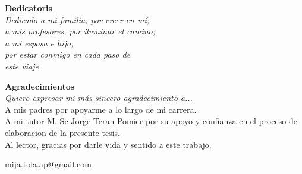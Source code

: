 \documentclass[12pt, openany]{book}
\title{
    \textbf{
      \Large{UNIVERSIDAD MAYOR DE SAN ANDR\'ES}\\
      \normalsize{
        FACULTAD DE CIENCIAS PURAS Y NATURALES\\
        CARRERA DE INFORM\'ATICA\\
      }
      \hfill \break
      \texttt{[image: umsa]}
      \break
      \begin{large}
        EVALUACION COMPARATIVA DE MODELOS GENERADORES DE GRAFOS ALEATORIOS PARA REDES COMPLEJAS
      \end{large}
      \break
      \small{
        Tesis de Grado para obtener el Título de Licenciatura en Informática \break
        Mención Ingeniería de Sistemas Informáticos\break
      }
      \break
      \large {
        POR: CARLOS MIJAEL TOLA APAZA\\
        TUTOR: M.Sc. JORGE TERAN
      }
      \break
      \small {
        LA PAZ - BOLIVIA \break
        Abril, 2024
      }
    }
}
\author{}
\date{}
\let\oldmaketitle\maketitle
\renewcommand{\maketitle}{\oldmaketitle\thispagestyle{empty}\newpage\setcounter{page}{1}}
\begin{document}
\maketitle


\thispagestyle{empty}
\vspace*{\fill} 

\begin{flushright}
  \textbf{Dedicatoria} \\
\textit{Dedicado a mi familia, por creer en mí;\\
 a mis profesores, por iluminar el camino;\\ 
a mi esposa e hijo, \\ 
por estar conmigo en cada paso de  \\
este viaje.}
\end{flushright}

\vspace{2cm} 
\newpage

\thispagestyle{empty} 

\vspace*{\fill} 

\begin{flushleft}
\textbf{Agradecimientos}\\ 
\textit{Quiero expresar mi más sincero agradecimiento a...}\\
A mis padres por apoyarme a lo largo de mi carrera. \\
A mi tutor M. Sc Jorge Teran Pomier por su apoyo y confianza en el proceso de elaboracion
de la presente tesis.\\
Al lector, gracias por darle vida y sentido a este trabajo.
\end{flushleft}

\vspace{\fill}
\begin{flushright}
  mija.tola.ap@gmail.com
\end{flushright}


\newpage


\singlespacing
\tableofcontents
\newpage
\listoffigures
\newpage
\listoftables
\newpage


\doublespacing
{}







\end{document}
